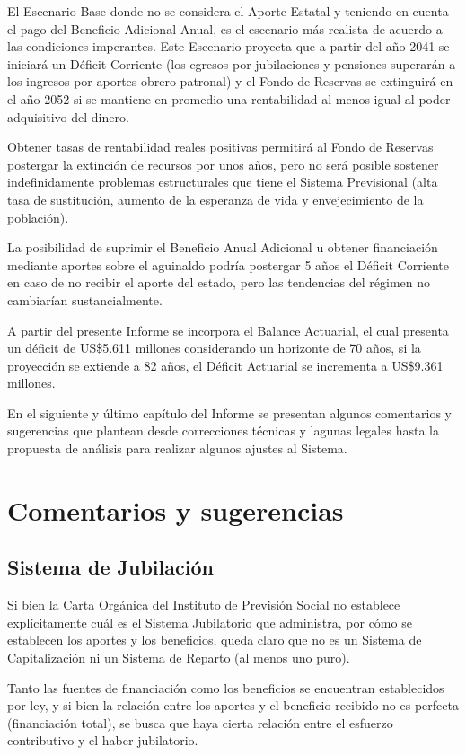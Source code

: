 \documentclass[a4paper,11pt]{article}
\begin{document}
El Escenario Base donde no se considera el Aporte Estatal y teniendo en cuenta el pago del Beneficio Adicional Anual, es el escenario más realista de acuerdo a las condiciones imperantes.  Este Escenario proyecta que a partir del año 2041 se iniciará un Déficit Corriente (los egresos por jubilaciones y pensiones superarán a los ingresos por aportes obrero-patronal) y el Fondo de Reservas se extinguirá en el año 2052 si se mantiene en promedio una rentabilidad al menos igual al poder adquisitivo del dinero.

Obtener tasas de rentabilidad reales positivas permitirá al Fondo de Reservas postergar la extinción de recursos por unos años, pero no será posible sostener indefinidamente problemas estructurales que tiene el Sistema Previsional (alta tasa de sustitución, aumento de la esperanza de vida y envejecimiento de la población).

La posibilidad de suprimir el Beneficio Anual Adicional u obtener financiación mediante aportes sobre el aguinaldo podría postergar 5 años el Déficit Corriente en caso de no recibir el aporte del estado, pero las tendencias del régimen no cambiarían sustancialmente.

A partir del presente Informe se incorpora el Balance Actuarial, el cual presenta un déficit de US\$5.611 millones considerando un horizonte de 70 años, si la proyección se extiende a 82 años, el Déficit Actuarial se incrementa a US\$9.361 millones.

En el siguiente y último capítulo del Informe se presentan algunos comentarios y sugerencias que plantean desde correcciones técnicas y lagunas legales hasta la propuesta de análisis para realizar algunos ajustes al Sistema.

\section{Comentarios y sugerencias}

\subsection{Sistema de Jubilación}

Si bien la Carta Orgánica del Instituto de Previsión Social no establece explícitamente cuál es el Sistema Jubilatorio que administra, por cómo se establecen los aportes y los beneficios, queda claro que no es un Sistema de Capitalización ni un Sistema de Reparto (al menos uno puro).

Tanto las fuentes de financiación como los beneficios se encuentran establecidos por ley, y si bien la relación entre los aportes y el beneficio recibido no es perfecta (financiación total), se busca que haya cierta relación entre el esfuerzo contributivo y el haber jubilatorio.
\end{document}
